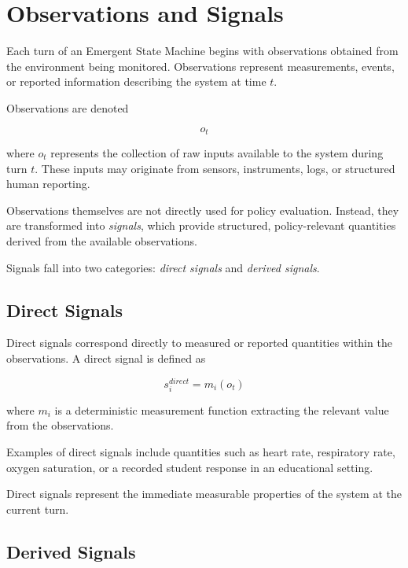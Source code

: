 \documentclass[11pt]{article}
\begin{document}


\section{Observations and Signals}

Each turn of an Emergent State Machine begins with observations obtained from the environment being monitored. Observations represent measurements, events, or reported information describing the system at time $t$.

Observations are denoted

\begin{equation}
o_t
\end{equation}

where $o_t$ represents the collection of raw inputs available to the system during turn $t$. These inputs may originate from sensors, instruments, logs, or structured human reporting.

Observations themselves are not directly used for policy evaluation. Instead, they are transformed into \emph{signals}, which provide structured, policy-relevant quantities derived from the available observations.

Signals fall into two categories: \emph{direct signals} and \emph{derived signals}.

\subsection{Direct Signals}

Direct signals correspond directly to measured or reported quantities within the observations. A direct signal is defined as

\begin{equation}
s_i^{direct} = m_i(o_t)
\end{equation}

where $m_i$ is a deterministic measurement function extracting the relevant value from the observations.

Examples of direct signals include quantities such as heart rate, respiratory rate, oxygen saturation, or a recorded student response in an educational setting.

Direct signals represent the immediate measurable properties of the system at the current turn.

\subsection{Derived Signals}
\end{document}
